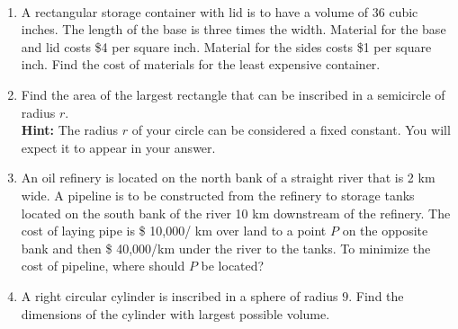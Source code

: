 \documentclass[11pt,fleqn]{article}
\begin{document}
\begin{center}
  \Large{}\\
\end{center}


\begin{enumerate}
\item A rectangular storage container with lid is to have a volume of 36 cubic inches. The length of the base is three times the width. Material for the base and lid costs \$4 per square inch. Material for the sides costs \$1 per square inch. Find the cost of materials for the least expensive container.
\vfill
\newpage
\item Find the area of the largest rectangle that can
  be inscribed in a semicircle of radius $r$.\\ \textbf{Hint:} The radius $r$ of your circle can be considered a fixed constant. You will expect it to appear in your answer. 
  \vfill
  \newpage
 \item An oil refinery is located on the north bank of a
straight river that is 2 km wide. A pipeline is to be constructed from
the refinery to storage tanks located on the south bank of the river 10
km downstream of the refinery. The cost of laying pipe is \$ 10,000/
km over land to a point $P$ on the opposite bank and then \$ 40,000/km
under the river to the tanks. To minimize the cost of pipeline, where
should $P$ be located? 
\vfill

\newpage
\item A right circular cylinder is inscribed in a sphere of radius $9.$ Find the dimensions of the cylinder with largest possible volume.

\vfill

\end{enumerate}


\end{document}
